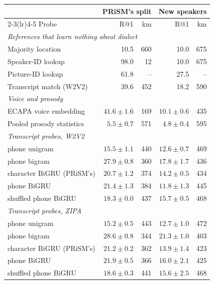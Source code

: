 \begin{tabular}{lrrrr}
\toprule
 & \multicolumn{2}{c}{PRiSM's split} & \multicolumn{2}{c}{New speakers} \\
\cmidrule(lr){2-3}\cmidrule(lr){4-5}
Probe & R@1 & km & R@1 & km \\
\midrule
\multicolumn{5}{l}{\textit{References that learn nothing about dialect}} \\
\quad Majority location & 10.5 & 660 & 10.0 & 675 \\
\quad Speaker-ID lookup & 98.0 & 12 & 10.0 & 675 \\
\quad Picture-ID lookup & 61.8 & -- & 27.5 & -- \\
\quad Transcript match (W2V2) & 39.6 & 452 & 18.2 & 590 \\
\midrule
\multicolumn{5}{l}{\textit{Voice and prosody}} \\
\quad ECAPA voice embedding & $41.6 \pm 1.6$ & 169 & $10.1 \pm 0.6$ & 435 \\
\quad Pooled prosody statistics & $5.5 \pm 0.7$ & 571 & $4.8 \pm 0.4$ & 595 \\
\midrule
\multicolumn{5}{l}{\textit{Transcript probes, W2V2}} \\
\quad phone unigram & $15.5 \pm 1.1$ & 440 & $12.6 \pm 0.7$ & 469 \\
\quad phone bigram & $27.9 \pm 0.8$ & 360 & $17.8 \pm 1.7$ & 436 \\
\quad character BiGRU (PRiSM's) & $20.7 \pm 1.2$ & 374 & $14.2 \pm 0.5$ & 434 \\
\quad phone BiGRU & $21.4 \pm 1.3$ & 384 & $11.8 \pm 1.3$ & 445 \\
\quad shuffled phone BiGRU & $18.3 \pm 0.0$ & 437 & $15.7 \pm 0.5$ & 468 \\
\midrule
\multicolumn{5}{l}{\textit{Transcript probes, ZIPA}} \\
\quad phone unigram & $15.2 \pm 0.5$ & 443 & $12.7 \pm 1.0$ & 472 \\
\quad phone bigram & $28.6 \pm 0.8$ & 344 & $21.3 \pm 1.0$ & 403 \\
\quad character BiGRU (PRiSM's) & $21.2 \pm 0.2$ & 362 & $13.9 \pm 1.4$ & 423 \\
\quad phone BiGRU & $21.9 \pm 0.5$ & 366 & $16.0 \pm 2.1$ & 425 \\
\quad shuffled phone BiGRU & $18.6 \pm 0.3$ & 441 & $15.6 \pm 2.5$ & 468 \\
\bottomrule
\end{tabular}
